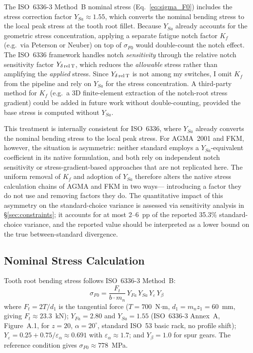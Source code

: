 \documentclass[12pt,a4paper]{article}
\begin{document}
The ISO~6336-3 Method~B nominal stress (Eq.~\ref{eq:sigma_F0}) includes
the stress correction factor $Y_{Sa} \approx 1.55$, which converts the
nominal bending stress to the local peak stress at the tooth root
fillet. Because $Y_{Sa}$ already accounts for the geometric stress
concentration, applying a separate fatigue notch factor $K_f$ (e.g.\
via Peterson or Neuber) on top of $\sigma_{F0}$ would double-count the
notch effect. The ISO~6336 framework handles notch \emph{sensitivity}
through the relative notch sensitivity factor $Y_{\delta\,\rm rel\,T}$,
which reduces the \emph{allowable} stress rather than amplifying the
\emph{applied} stress. Since $Y_{\delta\,\rm rel\,T}$ is not among my
switches, I omit $K_f$ from the pipeline and rely on $Y_{Sa}$ for the
stress concentration. A third-party method for $K_f$ (e.g.\ a 3D
finite-element extraction of the notch-root stress gradient) could be
added in future work without double-counting, provided the base stress
is computed without $Y_{Sa}$.

This treatment is internally consistent for ISO~6336, where $Y_{Sa}$
already converts the nominal bending stress to the local peak stress.
For AGMA~2001 and FKM, however, the situation is asymmetric: neither
standard employs a $Y_{Sa}$-equivalent coefficient in its native
formulation, and both rely on independent notch sensitivity or
stress-gradient-based approaches that are not replicated here. The
uniform removal of $K_f$ and adoption of $Y_{Sa}$ therefore alters the
native stress calculation chains of AGMA and FKM in two ways---%
introducing a factor they do not use and removing factors they do.
The quantitative impact of this asymmetry on the standard-choice
variance is assessed via sensitivity analysis in \S\ref{sec:constraints}; it accounts for at most 2--6~pp of the
reported 35.3\% standard-choice variance, and the reported value should
be interpreted as a lower bound on the true between-standard divergence.

\subsection{Nominal Stress Calculation}

Tooth root bending stress follows ISO~6336-3 Method~B:
\begin{equation}
\label{eq:sigma_F0}
\sigma_{F0} = \frac{F_t}{b \cdot m_n} \,
Y_{Fa} \, Y_{Sa} \, Y_\varepsilon \, Y_\beta
\end{equation}
where $F_t = 2T/d_1$ is the tangential force ($T=700$~N$\cdot$m,
$d_1 = m_n z_1 = 60$~mm, giving $F_t \approx 23.3$~kN);
$Y_{Fa}=2.80$ and $Y_{Sa}=1.55$ (ISO~6336-3 Annex~A, Figure~A.1,
for $z=20$, $\alpha=20^\circ$, standard ISO~53 basic rack, no profile
shift); $Y_\varepsilon = 0.25 + 0.75/\varepsilon_\alpha \approx 0.691$
with $\varepsilon_\alpha \approx 1.7$; and $Y_\beta = 1.0$ for spur
gears. The reference condition gives $\sigma_{F0} \approx 778$~MPa.
\end{document}
